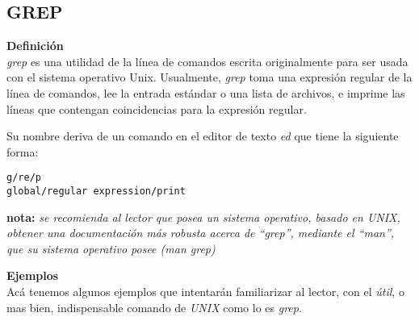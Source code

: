 \subsection{GREP}

\textbf{Definici\'on}\\

\emph{grep} es una utilidad de la línea de comandos escrita originalmente para ser usada con el sistema operativo Unix.
Usualmente,
\emph{grep} toma una expresión regular de la línea de comandos,
lee la entrada estándar o una lista de archivos,
e imprime las líneas que contengan coincidencias para la expresión regular.

Su nombre deriva de un comando en el editor de texto \emph{ed} que tiene la siguiente forma:
\begin{verbatim}
g/re/p
global/regular expression/print
\end{verbatim}
\textbf{nota:} \emph{se recomienda al lector que posea un sistema operativo,
basado en UNIX, obtener una documentación más robusta acerca de ``grep'',
mediante el ``man'', que su sistema operativo posee (man grep)}

\vspace{1cm}
\textbf{Ejemplos}\\

Acá tenemos algunos ejemplos que intentarán familiarizar al lector,
con el \emph{útil}, o mas bien, indispensable comando de \emph{UNIX}
como lo es \emph{grep}.

